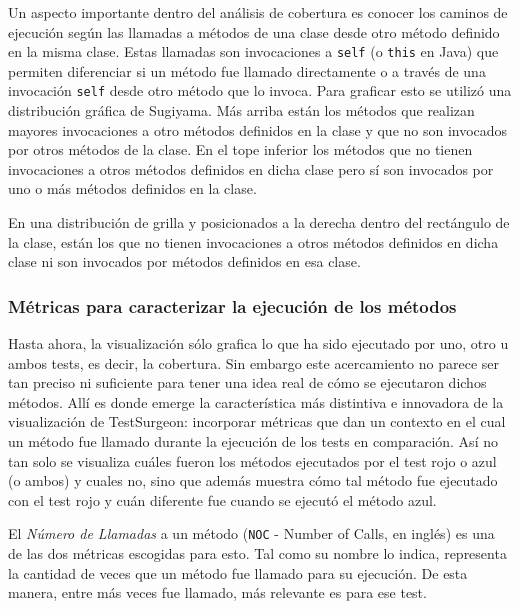 \par Un aspecto importante dentro del análisis de cobertura es conocer los caminos de ejecución según las llamadas a métodos de una clase desde otro método definido en la misma clase. Estas llamadas son invocaciones a {\tt self} (o {\tt this} en Java) que permiten diferenciar si un método fue llamado directamente o a través de una invocación {\tt self} desde otro método que lo invoca. Para graficar esto se utilizó una distribución gráfica de Sugiyama. Más arriba están los métodos que realizan mayores invocaciones a otro métodos definidos en la clase y que no son invocados por otros métodos de la clase. En el tope inferior los métodos que no tienen invocaciones a otros métodos definidos en dicha clase pero sí son invocados por uno o más métodos definidos en la clase.

\par En una distribución de grilla y posicionados a la derecha dentro del rectángulo de la clase, están los que no tienen invocaciones a otros métodos definidos en dicha clase ni son invocados por métodos definidos en esa clase.

\subsubsection{Métricas para caracterizar la ejecución de los métodos }

\par Hasta ahora, la visualización sólo grafica lo que ha sido ejecutado por uno, otro u ambos tests, es decir, la cobertura. Sin embargo este acercamiento no parece ser tan preciso ni suficiente para tener una idea real de cómo se ejecutaron dichos métodos. Allí es donde emerge la característica más distintiva e innovadora de la visualización de TestSurgeon: incorporar métricas que dan un contexto en el cual un método fue llamado durante la ejecución de los tests en comparación. Así no tan solo se visualiza cuáles fueron los métodos ejecutados por el test rojo o azul (o ambos) y cuales no, sino que además muestra cómo tal método fue ejecutado con el test rojo y cuán diferente fue cuando se ejecutó el método azul.

\par El \emph{Número de Llamadas} a un método ({\tt NOC} - Number of Calls, en inglés) es una de las dos métricas escogidas para esto. Tal como su nombre lo indica, representa la cantidad de veces que un método fue llamado para su ejecución. De esta manera, entre más veces fue llamado, más relevante es para ese test.

